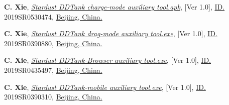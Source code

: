 \begin{etaremune}[label={[\reversearabic*]},leftmargin=0.041\textwidth,itemsep=0pt]
	\item \textbf{C. Xie}, \href{https://github.com/ChenZhu-Xie/Stardust_DDTank}{\textit{Stardust DDTank charge-mode auxiliary tool.apk}}, [Ver 1.0], \href{https://register.ccopyright.com.cn/query.html}{ID. }2019SR0530474, \href{https://register.ccopyright.com.cn/query.html}{Beijing, China.}
	\item \textbf{C. Xie}, \href{https://github.com/ChenZhu-Xie/Stardust_DDTank}{\textit{Stardust DDTank drag-mode auxiliary tool.exe}}, [Ver 1.0], \href{https://register.ccopyright.com.cn/query.html}{ID. }2019SR0390880, \href{https://register.ccopyright.com.cn/query.html}{Beijing, China.}
	\item \textbf{C. Xie}, \href{https://github.com/ChenZhu-Xie/Stardust_DDTank}{\textit{Stardust DDTank-Browser auxiliary tool.exe}}, [Ver 1.0], \href{https://register.ccopyright.com.cn/query.html}{ID. }2019SR0435497, \href{https://register.ccopyright.com.cn/query.html}{Beijing, China.}
	\item \textbf{C. Xie}, \href{https://github.com/ChenZhu-Xie/Stardust_DDTank}{\textit{Stardust DDTank-mobile auxiliary tool.exe}}, [Ver 1.0], \href{https://register.ccopyright.com.cn/query.html}{ID. }2019SR0390310, \href{https://register.ccopyright.com.cn/query.html}{Beijing, China.}
\end{etaremune}

